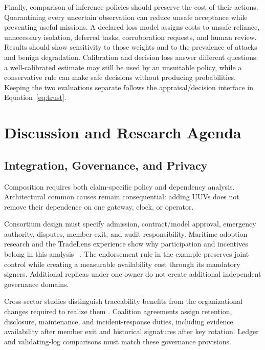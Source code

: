 \documentclass[blockchains,review,accept,moreauthors]{Definitions/mdpi}
\begin{document}
Finally, comparison of inference policies should preserve the cost of their actions. Quarantining every uncertain observation can reduce unsafe acceptance while preventing useful missions. A declared loss model assigns costs to unsafe reliance, unnecessary isolation, deferred tasks, corroboration requests, and human review. Results should show sensitivity to those weights and to the prevalence of attacks and benign degradation. Calibration and decision loss answer different questions: a well-calibrated estimate may still be used by an unsuitable policy, while a conservative rule can make safe decisions without producing probabilities. Keeping the two evaluations separate follows the appraisal/decision interface in Equation~\eqref{eq:trust}.


\section{Discussion and Research Agenda}

\subsection{Integration, Governance, and Privacy}

Composition requires both claim-specific policy and dependency analysis. Architectural common causes remain consequential: adding UUVs does not remove their dependence on one gateway, clock, or operator.

Consortium design must specify admission, contract/model approval, emergency authority, disputes, member exit, and audit responsibility. Maritime adoption research and the TradeLens experience show why participation and incentives belong in this \linebreak  analysis~ \citep{zhou2020key,farah2024survey,maersk2022tradelens}. The endorsement rule in the example preserves joint control while creating a measurable availability cost through its mandatory signers. Additional replicas under one owner do not create additional independent governance domains.

Cross-sector studies distinguish traceability benefits from the organizational changes required to realize them \citep{kshetri20181,lnes2017blockchain}. Coalition agreements assign retention, disclosure, maintenance, and incident-response duties, including evidence availability after member exit and historical signatures after key rotation. Ledger and validating-log comparisons must match these governance provisions.
\end{document}
